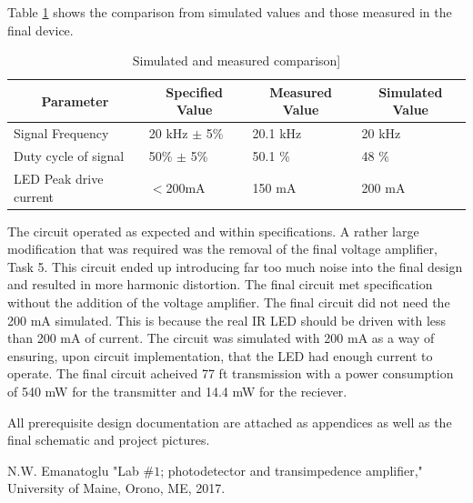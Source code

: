 \documentclass{article}
\begin{document}
Table \ref{tab:simcompare} shows the comparison from simulated values and those measured in the final device.
\begin{table}[H]
	\centering
	\caption{Simulated and measured comparison]}
	\label{tab:simcompare}
	\begin{tabular}{|l|l|l|l|}
		\hline
		\multicolumn{1}{|c|}{\textbf{Parameter}} & \multicolumn{1}{c|}{\textbf{Specified Value}} & \multicolumn{1}{c|}{\textbf{Measured Value}} & \multicolumn{1}{c|}{\textbf{Simulated Value}} \\ \hline
		Signal Frequency                         & 20 kHz $\pm$ 5\%                              & 20.1 kHz                                     & 20 kHz                                        \\ \hline
		Duty cycle of signal                     & 50\% $\pm$ 5\%                                & 50.1 \%                                      & 48 \%                                         \\ \hline
		LED Peak drive current                   & $<$200mA                                      & 150 mA                                       & 200 mA                                        \\ \hline
	\end{tabular}
\end{table}

The circuit operated as expected and within specifications. A rather large modification that was required was the removal of the final voltage amplifier, Task 5. This circuit ended up introducing far too much noise into the final design and resulted in more harmonic distortion. The final circuit met specification without the addition of the voltage amplifier. The final circuit did not need the 200 mA simulated. This is because the real IR LED should be driven with less than 200 mA of current. The circuit was simulated with 200 mA as a way of ensuring, upon circuit implementation, that the LED had enough current to operate. The final circuit acheived 77 ft transmission with a power consumption of 540 mW for the transmitter and 14.4 mW for the reciever.

All prerequisite design documentation are attached as appendices as well as the final schematic and project pictures.  
 
    
    \newpage
\clearpage

\appendix

\begin{thebibliography}{00}



 N.W. Emanatoglu "Lab $\#1$; photodetector and transimpedence amplifier," University of Maine, Orono, ME, 2017.
\newline

\newpage


\end{thebibliography}
\end{document}
